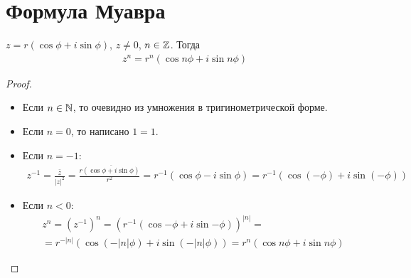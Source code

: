 \section{Формула Муавра}

\begin{theorem}{}
$z = r(\cos \phi + i\sin \phi)$, $z \ne 0$, $n \in \mathbb{Z}$. Тогда 
\begin{gather*}
z^n = r^n(\cos n\phi + i\sin n\phi)
\end{gather*}
\end{theorem} 
\begin{proof}
\begin{itemize}
\item Если $n \in \mathbb{N}$, то очевидно из умножения в тригинометрической форме.
\item Если $n = 0$, то написано $1 = 1$.
\item Если $n = -1$:
\begin{gather*} 
z^{-1} = \frac{\bar z}{|z|^2} = \frac{r\overline{(\cos \phi + i \sin \phi)}}{r^2} = r^{-1}(\cos \phi - i \sin \phi) = r^{-1}(\cos(-\phi) + i\sin(-\phi))
\end{gather*}
\item Если $n < 0$:
\begin{gather*}
z^n = \left(z^{-1}\right)^n = \left(r^{-1}(\cos{-\phi} + i \sin{-\phi})\right)^{|n|} = \\ 
= r^{-|n|}(\cos(-|n| \phi) + i \sin(-|n| \phi)) = r^n(\cos{n \phi} + i \sin{n \phi})
\end{gather*}
\end{itemize}
\end{proof}


